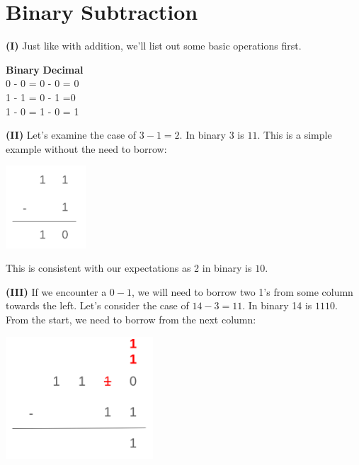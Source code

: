 \documentclass[12pt]{article}
\begin{document}
	\section{Binary Subtraction}
		\begin{minipage}[t]{.5\linewidth}
					\par\noindent \textbf{(I)} Just like with addition, we'll list out some basic operations first.
			\begin{flalign*}
				\textbf{Binary} \;\;\;\;\;\; \textbf{Decimal} \\
				0 - 0 = 0 \;\;\;\;\; - 0 = 0 \\
					1 - 1 = 0 \;\;\;\;\;\;1 - 1 =0 \\
				1 - 0 = 1 \;\;\;\;\; - 0 = 1 \\
			\end{flalign*}
			\par\noindent \textbf{(II)} Let's examine the case of \(3-1=2\). In binary 3 is \(11\). This is a simple example without the need to borrow:
			\begin{center}
				\includegraphics[width=3cm]{bin-sub-1.png}
			\end{center}
			\par\noindent This is consistent with our expectations as 2 in binary is \(10\).
			\newline
			\par\noindent \textbf{(III)} If we encounter a \(0-1\), we will need to borrow two 1's from some column towards the left. Let's consider the case of \(14-3=11\). In binary 14 is \(1110\). From the start, we need to borrow from the next column:
			\begin{center}
			\includegraphics[width=5.5cm]{bin-sub-2.png}
			\end{center}			
		\end{minipage}
\end{document}
